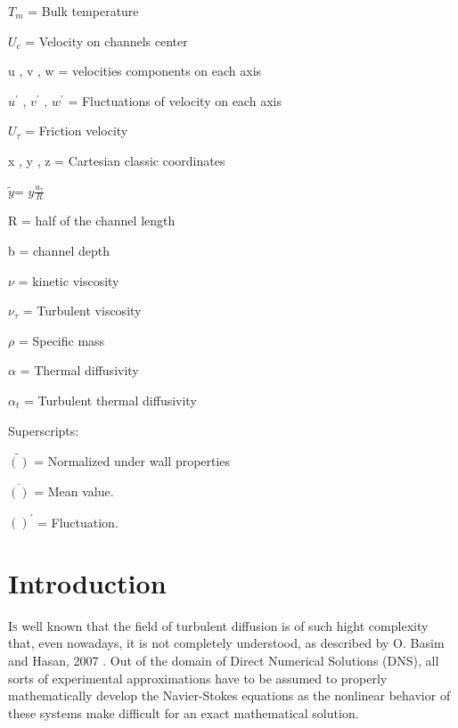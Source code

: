 \documentclass[10pt]{article} %
\begin{document}
	
	
	
	$T_m$ = Bulk temperature 
	
	
	
	
	${U}_c$ = Velocity on channels center
	
	
	
	u , v , w = velocities components on each axis
	
	
	$u^\prime $ , $ v^\prime $ , $ w^\prime $ = Fluctuations of velocity on each axis
	
	
	$U_\tau$ = Friction velocity
	
	
	x , y , z = Cartesian classic coordinates
	
	
	$\tilde{y} $= $ y \frac{u_\tau}{R} $
	
	
	R = half of the channel length
	
	
	
	b = channel depth
	
	
	
	$\nu$ = kinetic viscosity
	
	
	$\nu_\tau$ = Turbulent viscosity
	
	
	$\rho$ = Specific mass
	
	
	$\alpha$ = Thermal diffusivity
	
	
	$\alpha_t$ = Turbulent thermal diffusivity 
	
	\vspace{8.00mm}
	
	\begin{LARGE}
		Superscripts: 
	\end{LARGE} 
	
	$\tilde{()}$ = Normalized under wall properties
	
	$\overline{()}$ = Mean value.
	 
	$()^\prime$ = Fluctuation. 


\section{Introduction}

\lettrine[nindent=0em,lines=2]{I}s well known that the field of turbulent diffusion is of such hight complexity that, even nowadays, it is not completely understood, as described by O. Basim and Hasan, 2007 \cite{hasan}. Out of the domain of Direct Numerical Solutions (DNS), all sorts of experimental approximations have to be assumed to properly mathematically develop the Navier-Stokes equations as the nonlinear behavior of these systems \cite{John} make difficult for an exact mathematical solution. 
\end{document}
